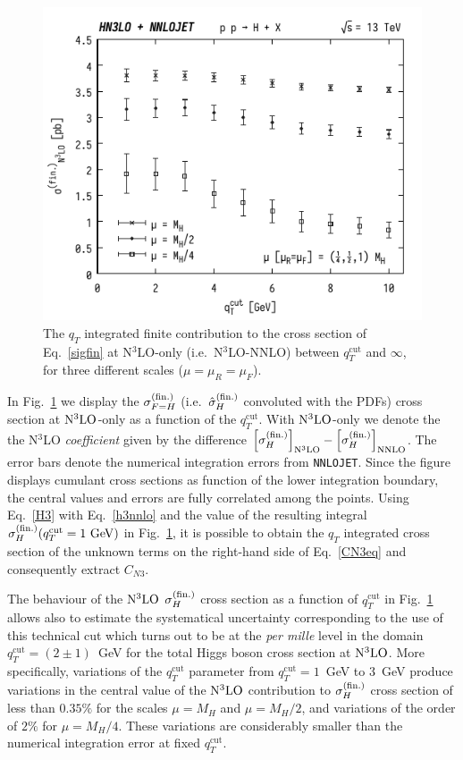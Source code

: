 \documentclass[12pt]{article}
\DeclareRobustCommand{\qt}{q_T}
\DeclareRobustCommand{\qtcut}{\ensuremath{q_T^\mathrm{cut}}}
\begin{document}
\begin{figure}[tb]
\centering
\includegraphics[width=.6\linewidth]{./new_figures/finN3LO}
\caption{\label{fig:finiten3lo}{The $\qt$ integrated finite contribution to the cross section of Eq.~\eqref{sigfin} at N$^{3}$LO-only (i.e.\ N$^{3}$LO-NNLO) between $\qtcut$ and $\infty$, for three different scales ($\mu=\mu_{R}=\mu_{F}$).}}
\end{figure}

In Fig.~\ref{fig:finiten3lo} we display the $\sigma_{F=H}^{(\rm fin.)}$ (i.e.\ ${\hat \sigma}_{H}^{(\rm fin.)}$ convoluted with the PDFs) cross section at $\rm N^3LO$-only as a function of the $\qtcut$. With $\rm N^3LO$-only we denote the the N$^3$LO \emph{coefficient} given by the difference $\Bigl[ \sigma_{H}^{(\rm fin.)}\Bigr]_{\rm N^{3}LO} - \Bigl[ \sigma_{H}^{(\rm fin.)}\Bigr]_{\rm NNLO}$. 
The error bars denote the numerical integration errors from  \texttt{NNLOJET}. Since the figure displays cumulant cross sections as function of the lower integration boundary, the central values and errors are fully correlated among the points.
Using Eq.~\eqref{H3} with Eq.~\eqref{h3nnlo} and the value of the resulting integral $ \sigma_{H}^{(\rm fin.)}(\qtcut=1~{\rm GeV})$ in Fig.~\ref{fig:finiten3lo}, it is possible to obtain the $\qt$ integrated cross section of the unknown terms on the right-hand side of Eq.~\eqref{CN3eq} and consequently extract $C_{N3}$. 

The behaviour of the $\rm N^3LO$ $\sigma_{H}^{(\rm fin.)}$ cross section as a function of $\qtcut$ in Fig.~\ref{fig:finiten3lo} allows also to estimate the systematical uncertainty corresponding to the use of this technical cut which turns out to be at the \textit{per mille} level in the domain $\qtcut=(2\pm 1)$~GeV for the total Higgs boson cross section at $\rm N^3LO$. More specifically, variations of the $\qtcut$ parameter from $\qtcut=1$~GeV to 3~GeV produce variations in the central value of the 
$\rm N^3LO$ contribution to $\sigma_{H}^{(\rm fin.)}$ cross section of less than $0.35\%$ for the scales $\mu=M_{H}$ and $\mu=M_{H}/2$, and variations of the order of $2\%$ for $\mu=M_{H}/4$. These variations are considerably smaller than the numerical integration error at fixed $\qtcut$. 
\end{document}
